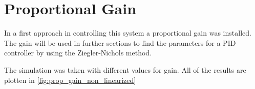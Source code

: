 \section{Proportional Gain}
In a first approach in controlling this system a proportional gain was installed. The gain will be used in further sections to find the parameters for a PID controller by using the Ziegler-Nichols method.

The simulation was taken with different values for gain. All of the results are plotten in \autoref{fig:prop_gain_non_linearized}
\begin{figure}[H]
    \centering

\end{figure}
